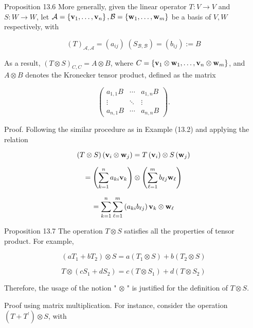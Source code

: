 \documentclass[11pt]{article}
\begin{document}
Proposition 13.6 More generally, given the linear operator \(T : V \rightarrow  V\) and \(S : W \rightarrow  W\), let \(\mathcal{A} = \left\{  {{\bf v}_1,\ldots ,{\bf v}_n}\right\}  ,\mathcal{B} = \left\{  {{\bf w}_1,\ldots ,{\bf w}_{m}}\right\}\) be a basis of \(V,W\) respectively, with

\[
{\left( T\right) }_{\mathcal{A},\mathcal{A}} = \left( {a}_{ij}\right) \;\left( {S}_{\mathcal{B},\mathcal{B}}\right)  = \left( {b}_{ij}\right)  \mathrel{\text{ := }} B
\]

As a result, \({\left( T \otimes  S\right) }_{C,C} = A \otimes  B\), where \(C = \left\{  {{\bf v}_1 \otimes  {\bf w}_1,\ldots ,{\bf v}_n \otimes  {\bf w}_{m}}\right\}\), and \(A \otimes  B\) denotes the Kronecker tensor product, defined as the matrix

\[
\left( \begin{matrix} {a}_{1,1}B & \cdots & {a}_{1,n}B \\  \vdots &  \ddots  & \vdots \\  {a}_{n,1}B & \cdots & {a}_{n,n}B \end{matrix}\right) .
\]

Proof. Following the similar procedure as in Example (13.2) and applying the relation

\[
\left( {T \otimes  S}\right) \left( {{\bf v}_{i} \otimes  {\bf w}_{j}}\right)  = T\left( {\bf v}_{i}\right)  \otimes  S\left( {\bf w}_{j}\right)
\]

\[
= \left( {\mathop{\sum }\limits_{{k = 1}}^n{a}_{ki}{\bf v}_{k}}\right)  \otimes  \left( {\mathop{\sum }\limits_{{\ell  = 1}}^{m}{b}_{\ell j}{\bf w}_{\ell }}\right)
\]

\[
= \mathop{\sum }\limits_{{k = 1}}^n\mathop{\sum }\limits_{{\ell  = 1}}^{m}\left( {{a}_{ki}{b}_{\ell j}}\right) {\bf v}_{k} \otimes  {\bf w}_{\ell }
\]

Proposition 13.7 The operation \(T \otimes  S\) satisfies all the properties of tensor product. For example,

\[
\left( {a{T}_1 + b{T}_2}\right)  \otimes  S = a\left( {{T}_1 \otimes  S}\right)  + b\left( {{T}_2 \otimes  S}\right)
\]

\[
T \otimes  \left( {c{S}_1 + d{S}_2}\right)  = c\left( {T \otimes  {S}_1}\right)  + d\left( {T \otimes  {S}_2}\right)
\]

Therefore, the usage of the notion " \(\otimes\) " is justified for the definition of \(T \otimes  S\).

Proof using matrix multiplication. For instance, consider the operation \(\left( {T + {T}^{\prime }}\right)  \otimes  S\), with
\end{document}
